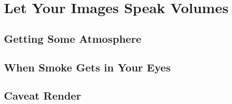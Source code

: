 \chapter{Let Your Images Speak Volumes}
\section{Getting Some Atmosphere}
\section{When Smoke Gets in Your Eyes}
\section{Caveat Render}